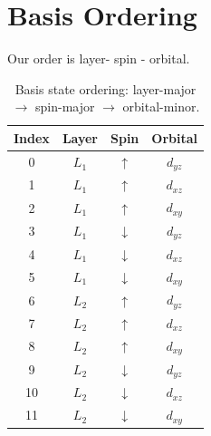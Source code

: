 \documentclass[11pt]{article}
\begin{document}
\section{Basis Ordering}
Our order is layer-\> spin -\> orbital. 
\begin{table}[h]
\centering
\begin{tabular}{cccc}
\hline
\textbf{Index} & \textbf{Layer} & \textbf{Spin} & \textbf{Orbital} \\
\hline
0  & $L_1$ & $\uparrow$ & $d_{yz}$ \\
1  & $L_1$ & $\uparrow$ & $d_{xz}$ \\
2  & $L_1$ & $\uparrow$ & $d_{xy}$ \\
3  & $L_1$ & $\downarrow$ & $d_{yz}$ \\
4  & $L_1$ & $\downarrow$ & $d_{xz}$ \\
5  & $L_1$ & $\downarrow$ & $d_{xy}$ \\
6  & $L_2$ & $\uparrow$ & $d_{yz}$ \\
7  & $L_2$ & $\uparrow$ & $d_{xz}$ \\
8  & $L_2$ & $\uparrow$ & $d_{xy}$ \\
9  & $L_2$ & $\downarrow$ & $d_{yz}$ \\
10 & $L_2$ & $\downarrow$ & $d_{xz}$ \\
11 & $L_2$ & $\downarrow$ & $d_{xy}$ \\
\hline
\end{tabular}
\caption{Basis state ordering: layer-major $\to$ spin-major $\to$ orbital-minor.}
\label{tab:basis_ordering}
\end{table}
\end{document}
